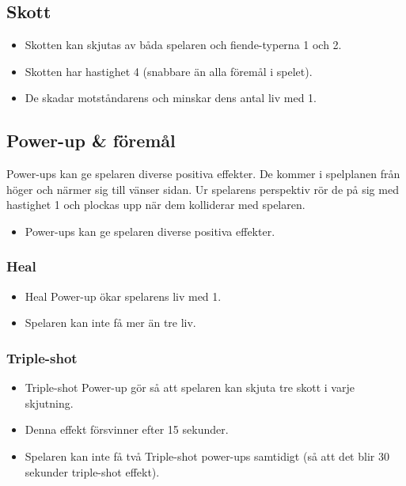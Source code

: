 \documentclass{TDP005mall}
\begin{document}
\subsection{Skott}
\begin{itemize}
\item Skotten kan skjutas av båda spelaren och fiende-typerna 1 och 2.
\item Skotten har hastighet 4 (snabbare än alla föremål i spelet).
\item De skadar motståndarens och minskar dens antal liv med 1.
\end{itemize}

\subsection{Power-up \& föremål}
Power-ups kan ge spelaren diverse positiva effekter. De kommer i spelplanen från höger och närmer sig till vänser sidan. Ur spelarens perspektiv rör de på sig med hastighet 1 och plockas upp när dem kolliderar med spelaren.

\begin{itemize}
\item Power-ups kan ge spelaren diverse positiva effekter.
\end{itemize}

\subsubsection*{Heal}
\begin{itemize}
\item Heal Power-up ökar spelarens liv med 1.
\item Spelaren kan inte få mer än tre liv.
  
\end{itemize}

\subsubsection*{Triple-shot}
\begin{itemize}
\item Triple-shot Power-up gör så att spelaren kan skjuta tre skott i varje skjutning.
\item Denna effekt försvinner efter 15 sekunder.
\item Spelaren kan inte få två Triple-shot power-ups samtidigt (så att det blir 30 sekunder triple-shot effekt).
\end{itemize}
\end{document}
